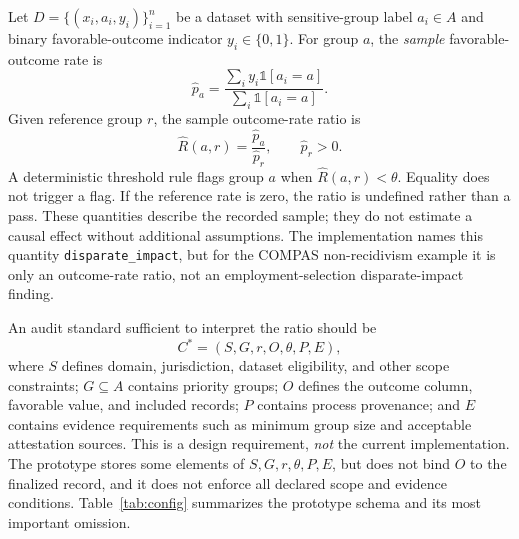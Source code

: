 \documentclass[10pt]{article}
\newcommand{\code}[1]{\texttt{#1}}
\begin{document}
Let $D=\{(x_i,a_i,y_i)\}_{i=1}^{n}$ be a dataset with sensitive-group label
$a_i\in A$ and binary favorable-outcome indicator $y_i\in\{0,1\}$. For group
$a$, the \emph{sample} favorable-outcome rate is
\begin{equation}
  \widehat p_a = \frac{\sum_i y_i\mathbb{1}[a_i=a]}
              {\sum_i \mathbb{1}[a_i=a]}.
\end{equation}
Given reference group $r$, the sample outcome-rate ratio is
\begin{equation}
  \widehat R(a,r)=\frac{\widehat p_a}{\widehat p_r},
  \qquad \widehat p_r>0.
\end{equation}
A deterministic threshold rule flags group $a$ when
$\widehat R(a,r)<\theta$. Equality does not trigger a flag.
If the reference rate is zero, the ratio is undefined rather than a pass.
These quantities describe the recorded sample; they do not estimate a causal
effect without additional assumptions. The implementation names this quantity
\code{disparate\_impact}, but for the COMPAS non-recidivism example it is only
an outcome-rate ratio, not an employment-selection disparate-impact finding.

An audit standard sufficient to interpret the ratio should be
\begin{equation}
  C^*=(S,G,r,O,\theta,P,E),
\end{equation}
where $S$ defines domain, jurisdiction, dataset eligibility, and other scope
constraints; $G\subseteq A$ contains priority groups; $O$ defines the outcome
column, favorable value, and included records; $P$ contains process provenance;
and $E$ contains evidence requirements such as minimum group size and acceptable
attestation sources. This is a design requirement, \emph{not} the current
implementation. The prototype stores some elements of $S,G,r,\theta,P,E$, but
does not bind $O$ to the finalized record, and it does not enforce all declared
scope and evidence conditions. Table~\ref{tab:config} summarizes the prototype
schema and its most important omission.
\end{document}
